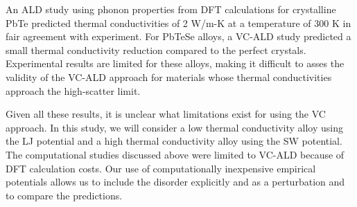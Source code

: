 An ALD study using phonon properties from DFT calculations for 
crystalline PbTe\cite{shiga_microscopic_2012} predicted 
thermal conductivities of 2 W/m-K at a temperature of 300 K 
in fair agreement with experiment. 
For PbTeSe alloys, a VC-ALD 
study predicted a small thermal conductivity reduction compared to the 
perfect crystals.\cite{tian_phonon_2012} Experimental results are limited 
for these alloys,\cite{kudman_thermoelectric_1972,pei_convergence_2011} 
making it difficult to asses the validity of the VC-ALD approach for 
materials whose thermal conductivities approach the high-scatter limit.

Given all these results, it is unclear what limitations exist for 
using the VC approach. 
In this study, we will consider a low thermal conductivity alloy  
using the LJ potential and a high thermal conductivity alloy using the 
SW potential. The computational studies discussed above were 
limited to VC-ALD 
because of DFT calculation costs. Our use of computationally 
inexpensive empirical potentials allows us to include the disorder 
explicitly and as a perturbation and to compare the predictions. 



